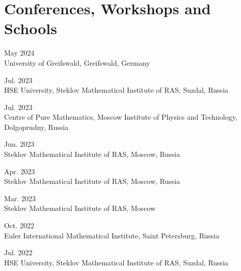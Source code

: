 \documentclass[11pt,letterpaper]{report}
\begin{document}
    
    
    
    \section*{Conferences, Workshops and Schools}
      
      \begin{tablist}
       
      \item{May 2024} \\ University of Greifswald, Greifswald, Germany 
      
      \item{Jul. 2023} \\ HSE University, Steklov Mathematical Institute of RAS, Suzdal, Russia
      
      \item{Jul. 2023}  \\ Centre of Pure Mathematics, Moscow Institute of Physics and Technology, Dolgoprudny, Russia
      
      \item{Jun. 2023} \\ Steklov Mathematical Institute of RAS, Moscow, Russia
      
      \item{Apr. 2023} \\ Steklov Mathematical Institute of RAS, Moscow, Russia
      
      \item{Mar. 2023} \\ Steklov Mathematical Institute of RAS, Moscow 
      
      \item{Oct. 2022} \\ Euler International Mathematical Institute, Saint
Petersburg, Russia
      
      \item{Jul. 2022} \\ HSE University, Steklov Mathematical Institute of RAS, Suzdal, Russia
      

\end{tablist}
\end{document}
